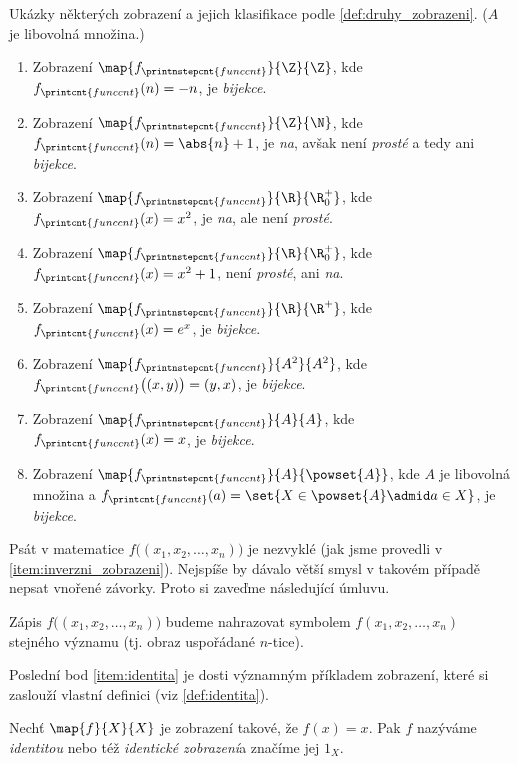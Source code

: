 \begin{example}
    Ukázky některých zobrazení a jejich klasifikace podle \ref{def:druhy_zobrazeni}. ($A$ je libovolná množina.)
    \begin{enumerate}[label=(\roman*)]
        \item Zobrazení $\map{f_{\printnstepcnt{funccnt}}}{\Z}{\Z}$, kde $f_{\printcnt{funccnt}}(n)=-n$, je \emph{bijekce}.
        \item Zobrazení $\map{f_{\printnstepcnt{funccnt}}}{\Z}{\N}$, kde $f_{\printcnt{funccnt}}(n)=\abs{n}+1$, je \emph{na}, avšak není \emph{prosté} a tedy ani \emph{bijekce}.
        \item Zobrazení $\map{f_{\printnstepcnt{funccnt}}}{\R}{\R_0^+}$, kde $f_{\printcnt{funccnt}}(x)=x^2$, je \emph{na}, ale není \emph{prosté}.
        \item Zobrazení $\map{f_{\printnstepcnt{funccnt}}}{\R}{\R_0^+}$, kde $f_{\printcnt{funccnt}}(x)=x^2+1$, není \emph{prosté}, ani \emph{na}.
        \item Zobrazení $\map{f_{\printnstepcnt{funccnt}}}{\R}{\R^+}$, kde $f_{\printcnt{funccnt}}(x)=e^x$, je \emph{bijekce}.
        \item\label{item:inverzni_zobrazeni} Zobrazení $\map{f_{\printnstepcnt{funccnt}}}{A^2}{A^2}$, kde $f_{\printcnt{funccnt}}\big((x,y)\big)=(y,x)$, je \emph{bijekce}.
        \item\label{item:identita} Zobrazení $\map{f_{\printnstepcnt{funccnt}}}{A}{A}$, kde $f_{\printcnt{funccnt}}(x)=x$, je \emph{bijekce}.
        \item \sloppy Zobrazení $\map{f_{\printnstepcnt{funccnt}}}{A}{\powset{A}}$, kde $A$ je libovolná množina a $f_{\printcnt{funccnt}}(a)=\set{X\in\powset{A}\admid a\in X}$, je \emph{bijekce}.
    \end{enumerate}
\end{example}
Psát v matematice $f\big((x_1,x_2,\dots,x_n)\big)$ je nezvyklé (jak jsme provedli v \ref{item:inverzni_zobrazeni}). Nejspíše by dávalo větší smysl v takovém případě nepsat vnořené závorky. Proto si zaveďme následující úmluvu.
\begin{convention}
    \sloppy Zápis $f\big((x_1,x_2,\dots,x_n)\big)$ budeme nahrazovat symbolem $f(x_1,x_2,\dots,x_n)$ stejného významu (tj. obraz uspořádané $n$-tice).
\end{convention}
Poslední bod \ref{item:identita} je dosti významným příkladem zobrazení, které si zaslouží vlastní definici (viz \ref{def:identita}).
\begin{definition}[Identita]\label{def:identita}
    Nechť $\map{f}{X}{X}$ je zobrazení takové, že $f(x)=x$. Pak $f$ nazýváme \emph{identitou} nebo též \emph{identické zobrazení}a značíme jej $1_X$.
\end{definition}

